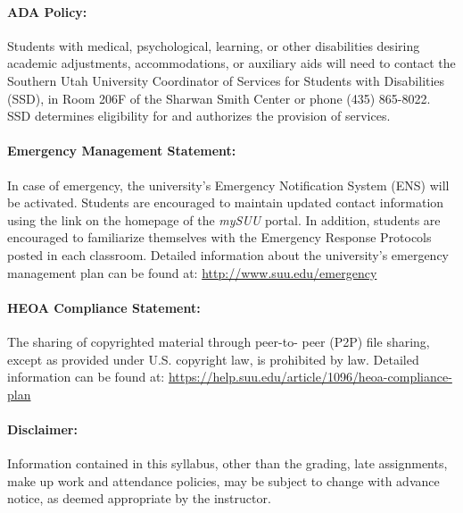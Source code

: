 \documentclass[12pt, letterpaper]{article}
\begin{document}
\paragraph{ADA Policy:}
Students with medical, psychological, learning, or other disabilities desiring academic adjustments, accommodations, or auxiliary aids will need to contact the Southern Utah University Coordinator of Services for Students with Disabilities (SSD), in Room 206F of the Sharwan Smith Center or phone (435) 865-8022. SSD determines eligibility for and authorizes the provision of services.

\paragraph{Emergency Management Statement:}
In case of emergency, the university's Emergency Notification System (ENS) will be activated. Students are encouraged to maintain updated contact information using the link on the homepage of the \emph{mySUU} portal. In addition, students are encouraged to familiarize themselves with the Emergency Response Protocols posted in each classroom. Detailed information about the university's emergency management plan can be found at: \href{http://www.suu.edu/emergency}{http://www.suu.edu/emergency}

\paragraph{HEOA Compliance Statement:}
The sharing of copyrighted material through peer-to- peer (P2P) file sharing, except as provided under U.S. copyright law, is prohibited by law. Detailed information can be found at: \href{https://help.suu.edu/article/1096/heoa-compliance-plan}{https://help.suu.edu/article/1096/heoa-compliance-plan}

\paragraph{Disclaimer:}
Information contained in this syllabus, other than the grading, late assignments, make up work and attendance policies, may be subject to change with advance notice, as deemed appropriate by the instructor.
\end{document}
